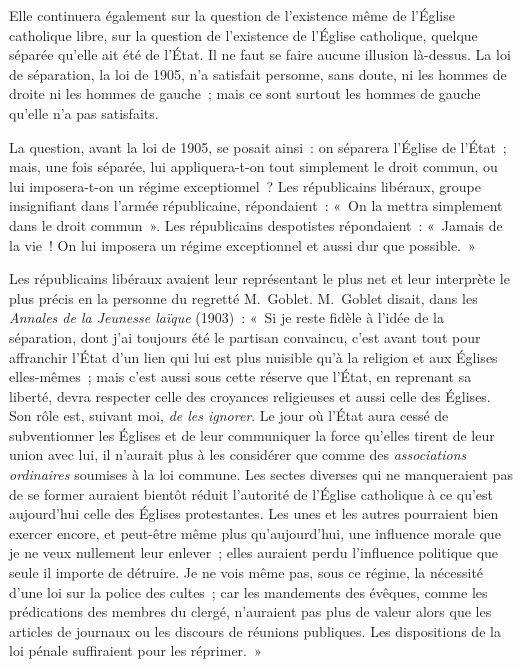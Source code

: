 \documentclass[french,twoside]{book} %
\begin{document}
\noindent Elle continuera également sur la question de l’existence même de l’Église catholique libre, sur la question de l’existence de l’Église catholique, quelque séparée qu’elle ait été de l’État. Il ne faut se faire aucune illusion là-dessus. La loi de séparation,  la loi de 1905, n’a satisfait personne, sans doute, ni les hommes de droite ni les hommes de gauche ; mais ce sont surtout les hommes de gauche qu’elle n’a pas satisfaits.\par
La question, avant la loi de 1905, se posait ainsi : on séparera l’Église de l’État ; mais, une fois séparée, lui appliquera-t-on tout simplement le droit commun, ou lui imposera-t-on un régime exceptionnel ? Les républicains libéraux, groupe insignifiant dans l’armée républicaine, répondaient : « On la mettra simplement dans le droit commun ». Les républicains despotistes répondaient : « Jamais de la vie ! On lui imposera un régime exceptionnel et aussi dur que possible. »\par
Les républicains libéraux avaient leur représentant le plus net et leur interprète le plus précis en la personne du regretté M. Goblet. M. Goblet disait, dans les \emph{Annales de la Jeunesse laïque} (1903) : « Si je reste fidèle à l’idée de la séparation, dont j’ai toujours été le partisan convaincu, c’est avant tout pour affranchir l’État d’un lien qui lui est plus nuisible qu’à la religion et aux Églises elles-mêmes ; mais c’est aussi sous cette réserve que l’État, en reprenant sa liberté, devra respecter celle des croyances religieuses et aussi celle des Églises. Son rôle est, suivant moi, {\itshape de les ignorer}.  Le jour où l’État aura cessé de subventionner les Églises et de leur communiquer la force qu’elles tirent de leur union avec lui, il n’aurait plus à les considérer que comme des {\itshape associations ordinaires} soumises à la loi commune. Les sectes diverses qui ne manqueraient pas de se former auraient bientôt réduit l’autorité de l’Église catholique à ce qu’est aujourd’hui celle des Églises protestantes. Les unes et les autres pourraient bien exercer encore, et peut-être même plus qu’aujourd’hui, une influence morale que je ne veux nullement leur enlever ; elles auraient perdu l’influence politique que seule il importe de détruire. Je ne vois même pas, sous ce régime, la nécessité d’une loi sur la police des cultes ; car les mandements des évêques, comme les prédications des membres du clergé, n’auraient pas plus de valeur alors que les articles de journaux ou les discours de réunions publiques. Les dispositions de la loi pénale suffiraient pour les réprimer. »\par
\end{document}
